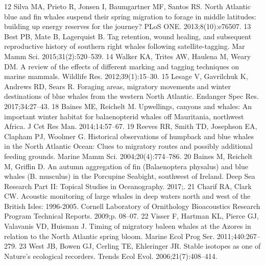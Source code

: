 \documentclass[a4paper,12pt]{article}
\begin{document}
12 Silva MA, Prieto R, Jonsen I, Baumgartner MF, Santos RS. North
Atlantic blue and fin whales suspend their spring migration to forage
in middle latitudes: building up energy reserves for the journey? PLoS ONE. 2013;8(10):e76507.
13 Best PB, Mate B, Lagerquist B. Tag retention, wound healing, and
subsequent reproductive history of southern right whales following
satellite-tagging. Mar Mamm Sci. 2015;31(2):520–539.
14 Walker KA, Trites AW, Haulena M, Weary DM. A review of the effects
of different marking and tagging techniques on marine mammals.
Wildlife Res. 2012;39(1):15–30.
15 Lesage V, Gavrilchuk K, Andrews RD, Sears R. Foraging areas,
migratory movements and winter destinations of blue whales from the
western North Atlantic. Endanger Spec Res. 2017;34:27–43.
18 Baines ME, Reichelt M. Upwellings, canyons and whales: An
important winter habitat for balaenopterid whales off Mauritania,
northwest Africa. J Cet Res Man. 2014;14:57–67.
19 Reeves RR, Smith TD, Josephson EA, Clapham PJ, Woolmer G.
Historical observations of humpback and blue whales in the North
Atlantic Ocean: Clues to migratory routes and possibly additional
feeding grounds. Marine Mamm Sci. 2004;20(4):774–786.
20 Baines M, Reichelt M, Griffin D. An autumn aggregation of fin
(Balaenoptera physalus) and blue whales (B. musculus) in the Porcupine
Seabight, southwest of Ireland. Deep Sea Research Part II: Topical
Studies in Oceanography. 2017;.
21 Charif RA, Clark CW. Acoustic monitoring of large whales in deep
waters north and west of the British Isles: 1996-2005. Cornell
Laboratory of Ornithology Bioacoustics Research Program Technical
Reports. 2009;p. 08–07.
22 Visser F, Hartman KL, Pierce GJ, Valavanis VD, Huisman J. Timing of
migratory baleen whales at the Azores in relation to the North Atlantic
spring bloom. Marine Ecol Prog Ser. 2011;440:267–279.
23 West JB, Bowen GJ, Cerling TE, Ehleringer JR. Stable isotopes as one of
Nature’s ecological recorders. Trends Ecol Evol. 2006;21(7):408–414.
\end{document}
